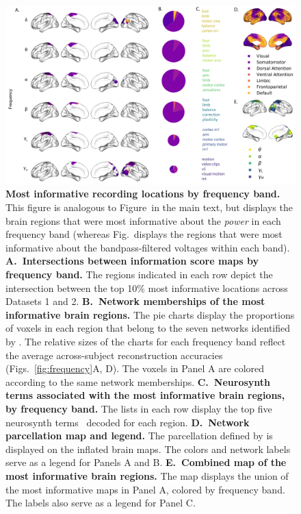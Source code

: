\documentclass[10pt]{article}
\begin{document}
\begin{figure}[p]
\centering \includegraphics[width=\textwidth]{figs/supplemental_5}
\caption{\textbf{Most informative recording locations by frequency band.} This
figure is analogous to Figure~\infomapfreqs in the main text, but displays the
brain regions that were most informative about the \textit{power} in each
frequency band (whereas Fig.~\infomapfreqs displays the regions that were most
informative about the bandpass-filtered voltages within each band).
\textbf{A.~Intersections between information score maps by frequency band.} The
regions indicated in each row depict the intersection between the top 10\% most
informative locations across Datasets 1 and 2.  \textbf{B.~Network memberships
of the most informative brain regions.}  The pie charts display the proportions
of voxels in each region that belong to the seven networks identified by
\cite{YeoEtal11}.  The relative sizes of the charts for each frequency band
reflect the average across-subject reconstruction accuracies
(Figs.~\ref{fig:frequency}A, D).  The voxels in Panel A are colored according to
the same network memberships.  \textbf{C.~Neurosynth terms associated with the
most informative brain regions, by frequency band.}  The lists in each row
display the top five neurosynth terms~\citep{RubiEtal17} decoded for each
region.  \textbf{D.~Network parcellation map and legend.}  The parcellation
defined by \cite{YeoEtal11} is displayed on the inflated brain maps.  The colors
and network labels serve as a legend for Panels A and B. \textbf{E.~Combined map
of the most informative brain regions.}  The map displays the union of the most
informative maps in Panel A, colored by frequency band.  The labels also serve
as a legend for Panel C.}
\label{fig:supplemental_5}
\end{figure}
\end{document}

